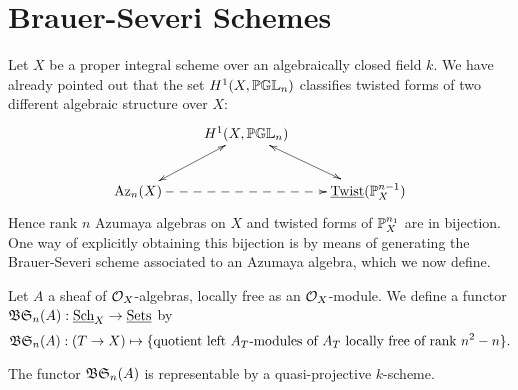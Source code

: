 \section{Brauer-Severi Schemes}
Let $X$ be a proper integral scheme over an algebraically closed field $k$.  We have already pointed out that the set $H^1(X,\mathbb{PGL}_n)$ classifies twisted forms of two different algebraic structure over $X$:
$$\xymatrix{
& \ar@{<->}[dl]H^1(X,\bbpgl_n) \ar@{<->}[dr]&\\
\Az_n(X)\ar@{-->}[rr] & & \twist(\bbp_X^{n-1})
}$$
Hence rank $n$ Azumaya algebras on $X$ and twisted forms of $\mathbb{P}^{n_1}_X$ are in bijection.  One way of explicitly obtaining this bijection is by means of generating the Brauer-Severi scheme associated to an Azumaya algebra, which we now define.

Let $A$ a sheaf of $\mathcal{O}_X$-algebras, locally free as an $\mathcal{O}_X$-module.  We define a functor $\mathfrak{BS}_n(A): \textnormal{\underline{Sch}}_X\rightarrow \textnormal{\underline{Sets}}$ by
$$\mathfrak{BS}_n(A): (T\rightarrow X)\mapsto \{\text{quotient left $A_T$-modules of $A_T$ locally free of rank $n^2-n$}\}.$$
\begin{lem}
The functor $\mathfrak{BS}_n(A)$ is representable by a quasi-projective $k$-scheme.
\end{lem}
